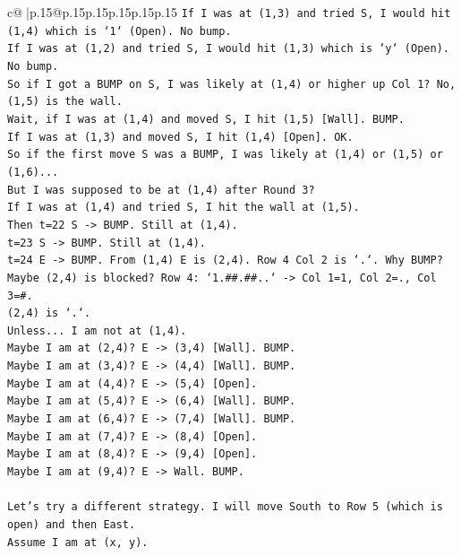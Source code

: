 \documentclass{article}
\begin{document}
{\begin{supertabular}{c@{$\;$}|p{.15\linewidth}@{}p{.15\linewidth}p{.15\linewidth}p{.15\linewidth}p{.15\linewidth}p{.15\linewidth}}
{{{\texttt{If I was at (1,3) and tried S, I would hit (1,4) which is `1` (Open). No bump.} \\
\texttt{If I was at (1,2) and tried S, I would hit (1,3) which is `y` (Open). No bump.} \\
\texttt{So if I got a BUMP on S, I was likely at (1,4) or higher up Col 1? No, (1,5) is the wall.} \\
\texttt{Wait, if I was at (1,4) and moved S, I hit (1,5) {[}Wall{]}. BUMP.} \\
\texttt{If I was at (1,3) and moved S, I hit (1,4) {[}Open{]}. OK.} \\
\texttt{So if the first move S was a BUMP, I was likely at (1,4) or (1,5) or (1,6)...} \\
\texttt{But I was supposed to be at (1,4) after Round 3?} \\
\texttt{If I was at (1,4) and tried S, I hit the wall at (1,5).} \\
\texttt{Then t=22 S {-}> BUMP. Still at (1,4).} \\
\texttt{t=23 S {-}> BUMP. Still at (1,4).} \\
\texttt{t=24 E {-}> BUMP. From (1,4) E is (2,4). Row 4 Col 2 is `.`. Why BUMP?} \\
\texttt{Maybe (2,4) is blocked? Row 4: `1.\#\#.\#\#..` {-}> Col 1=1, Col 2=., Col 3=\#.} \\
\texttt{(2,4) is `.`.} \\
\texttt{Unless... I am not at (1,4).} \\
\texttt{Maybe I am at (2,4)? E {-}> (3,4) {[}Wall{]}. BUMP.} \\
\texttt{Maybe I am at (3,4)? E {-}> (4,4) {[}Wall{]}. BUMP.} \\
\texttt{Maybe I am at (4,4)? E {-}> (5,4) {[}Open{]}.} \\
\texttt{Maybe I am at (5,4)? E {-}> (6,4) {[}Wall{]}. BUMP.} \\
\texttt{Maybe I am at (6,4)? E {-}> (7,4) {[}Wall{]}. BUMP.} \\
\texttt{Maybe I am at (7,4)? E {-}> (8,4) {[}Open{]}.} \\
\texttt{Maybe I am at (8,4)? E {-}> (9,4) {[}Open{]}.} \\
\texttt{Maybe I am at (9,4)? E {-}> Wall. BUMP.} \\
\\ 
\texttt{Let's try a different strategy. I will move South to Row 5 (which is open) and then East.} \\
\texttt{Assume I am at (x, y).} \\
}}}
\end{supertabular}}
\end{document}
